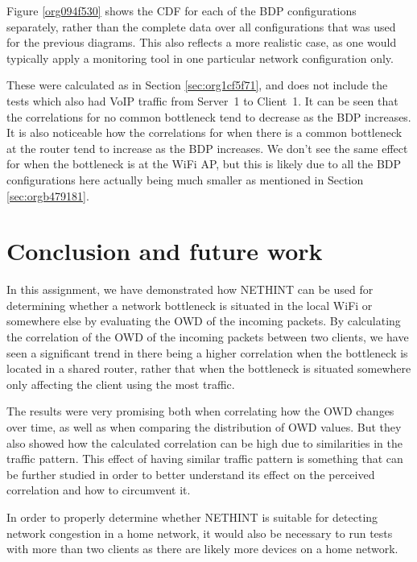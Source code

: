 \documentclass[a4paper,11pt]{article}
\begin{document}
Figure \ref{org094f530} shows the CDF for each of the BDP configurations separately, rather than the complete data over all configurations that was used for the previous diagrams. This also reflects a more realistic case, as one would typically apply a monitoring tool in one particular network configuration only.

These were calculated as in Section \ref{sec:org1cf5f71}, and does not include the tests which also had VoIP traffic from Server~1 to Client~1. It can be seen that the correlations for no common bottleneck tend to decrease as the BDP increases. It is also noticeable how the correlations for when there is a common bottleneck at the router tend to increase as the BDP increases. We don't see the same effect for when the bottleneck is at the WiFi AP, but this is likely due to all the BDP configurations here actually being much smaller as mentioned in Section \ref{sec:orgb479181}.
\section{Conclusion and future work}
\label{sec:org863f864}
In this assignment, we have demonstrated how NETHINT can be used for determining whether a network bottleneck is situated in the local WiFi or somewhere else by evaluating the OWD of the incoming packets. By calculating the correlation of the OWD of the incoming packets between two clients, we have seen a significant trend in there being a higher correlation when the bottleneck is located in a shared router, rather that when the bottleneck is situated somewhere only affecting the client using the most traffic.

The results were very promising both when correlating how the OWD changes over time, as well as when comparing the distribution of OWD values. But they also showed how the calculated correlation can be high due to similarities in the traffic pattern. This effect of having similar traffic pattern is something that can be further studied in order to better understand its effect on the perceived correlation and how to circumvent it.

In order to properly determine whether NETHINT is suitable for detecting network congestion in a home network, it would also be necessary to run tests with more than two clients as there are likely more devices on a home network.
\end{document}
